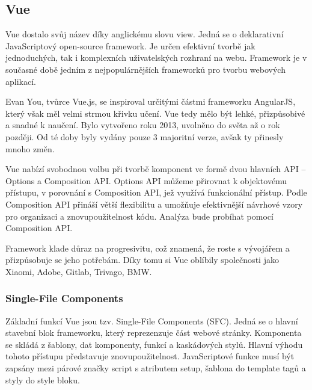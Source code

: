 \subsection{Vue}


Vue dostalo svůj název díky anglickému slovu view. Jedná se o deklarativní JavaScriptový open-source framework. 
Je určen efektivní tvorbě jak jednoduchých, tak i komplexních uživatelských rozhraní na webu. 
Framework je v současné době jedním z nejpopulárnějších frameworků pro tvorbu webových aplikací.\cite{vuemacrae,vue}

Evan You, tvůrce Vue.js, se inspiroval určitými částmi frameworku AngularJS, který však měl velmi strmou křivku učení. 
Vue tedy mělo být lehké, přizpůsobivé a snadné k naučení. Bylo vytvořeno roku 2013, uvolněno do světa až o rok později. 
Od té doby byly vydány pouze 3 majoritní verze, avšak ty přinesly mnoho změn.\cite{vueflexiple,vuemedium}

Vue nabízí svobodnou volbu při tvorbě komponent ve formě dvou hlavních API -- Options a Composition API. 
Options API můžeme přirovnat k objektovému přístupu, v porovnání s Composition API, jež využívá funkcionální přístup. 
Podle \cite{vue} Composition API přináší větší flexibilitu a umožňuje efektivnější návrhové vzory pro organizaci a znovupoužitelnost kódu. 
Analýza bude probíhat pomocí Composition API.

Framework klade důraz na progresivitu, což znamená, že roste s vývojářem a přizpůsobuje se jeho potřebám. 
Díky tomu si Vue oblíbily společnosti jako Xiaomi, Adobe, Gitlab, Trivago, BMW.\cite{vuetriodev,vue}

\subsubsection{Single-File Components}

Základní funkcí Vue jsou tzv. Single-File Components (SFC). Jedná se o hlavní stavební blok frameworku, který reprezenzuje část webové stránky. 
Komponenta se skládá z šablony, dat komponenty, funkcí a kaskádových stylů. Hlavní výhodu tohoto přístupu představuje znovupoužitelnost. 
JavaScriptové funkce musí být zapsány mezi párové značky script s atributem setup, šablona do template tagů a styly do style bloku.\cite{vuemacrae,vue}

